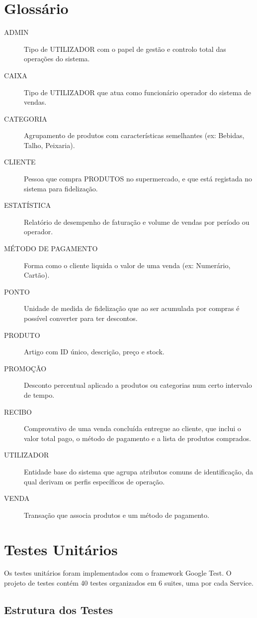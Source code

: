 \documentclass[a4paper]{llncs}
\begin{document}
\section{Glossário}
\begin{description}
    \item[ADMIN] Tipo de UTILIZADOR com o papel de gestão e controlo total das operações do sistema.
    \item[CAIXA] Tipo de UTILIZADOR que atua como funcionário operador do sistema de vendas.
    \item[CATEGORIA] Agrupamento de produtos com características semelhantes (ex: Bebidas, Talho, Peixaria).
    \item[CLIENTE] Pessoa que compra PRODUTOS no supermercado, e que está registada no sistema para fidelização.
    \item[ESTATÍSTICA] Relatório de desempenho de faturação e volume de vendas por período ou operador.
    \item[MÉTODO DE PAGAMENTO] Forma como o cliente liquida o valor de uma venda (ex: Numerário, Cartão).
    \item[PONTO] Unidade de medida de fidelização que ao ser acumulada por compras é possível converter para ter descontos.
    \item[PRODUTO] Artigo com ID único, descrição, preço e stock.
    \item[PROMOÇÃO] Desconto percentual aplicado a produtos ou categorias num certo intervalo de tempo.
    \item[RECIBO] Comprovativo de uma venda concluída entregue ao cliente, que inclui o valor total pago, o método de pagamento e a lista de produtos comprados.
    \item[UTILIZADOR] Entidade base do sistema que agrupa atributos comuns de identificação, da qual derivam os perfis específicos de operação.
    \item[VENDA] Transação que associa produtos e um método de pagamento.
\end{description}

\section{Testes Unitários}

Os testes unitários foram implementados com o framework Google Test. O projeto de testes contém 40 testes organizados em 6 suites, uma por cada Service.

\subsection{Estrutura dos Testes}
\end{document}
